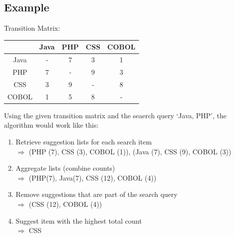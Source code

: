 \subsection{Example}
Transition Matrix:\\
\newline
\begin{tabular}{c | c |c | c | c}
		  & Java & PHP & CSS & COBOL\\
	\hline
	Java  &  -   &  7  &  3  &   1  \\
	\hline
	PHP   &  7   &  -  &  9  &   3  \\
	\hline
	CSS   &  3   &  9  &  -  &   8  \\
	\hline
	COBOL &  1   &  5  &  8  &   -  \\
\end{tabular}
\newline
\newline
Using the given transition matrix and the seaerch query `Java, PHP', the algorithm would work like this:
\begin{enumerate}
	\item Retrieve suggestion lists for each search item\\
		$\Rightarrow$ (PHP (7), CSS (3), COBOL (1)), (Java (7), CSS (9), COBOL (3))
	\item Aggregate lists (combine counts)\\
		$\Rightarrow$ (PHP(7), Java(7), CSS (12), COBOL (4))
	\item Remove suggestions that are part of the search query\\
		$\Rightarrow$ (CSS (12), COBOL (4))
	\item Suggest item with the highest total count\\
		$\Rightarrow$ CSS

\end{enumerate}
